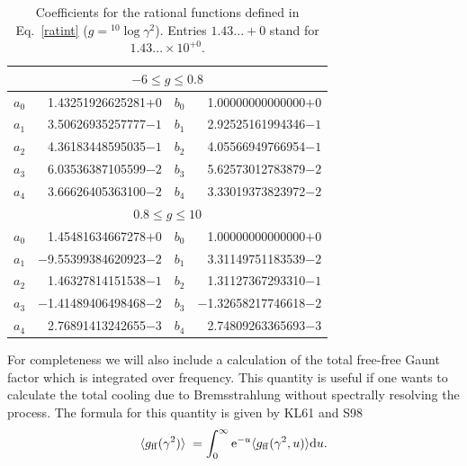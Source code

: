 \documentclass[useAMS,usenatbib]{mn2e}
\begin{document}
\begin{table}
\caption{Coefficients for the rational functions defined in Eq.~\ref{ratint}
  ($g = {}^{10}\log\gamma^2$). Entries $1.43...+0$ stand for
  $1.43...\times10^{+0}$.\label{ratcoef}}
\begin{tabular}{lrlr}
\hline
\multicolumn{4}{c}{$-6 \leq g \leq 0.8$} \\
\hline
$a_0$ & 1.43251926625281$+0$ & $b_0$ & 1.00000000000000$+0$ \\
$a_1$ & 3.50626935257777$-1$ & $b_1$ & 2.92525161994346$-1$ \\
$a_2$ & 4.36183448595035$-1$ & $b_2$ & 4.05566949766954$-1$ \\
$a_3$ & 6.03536387105599$-2$ & $b_3$ & 5.62573012783879$-2$ \\
$a_4$ & 3.66626405363100$-2$ & $b_4$ & 3.33019373823972$-2$ \\
\hline
\multicolumn{4}{c}{$0.8 \leq g \leq 10$} \\
\hline
$a_0$ &    1.45481634667278$+0$ & $b_0$ &    1.00000000000000$+0$ \\
$a_1$ & $-$9.55399384620923$-2$ & $b_1$ &    3.31149751183539$-2$ \\
$a_2$ &    1.46327814151538$-1$ & $b_2$ &    1.31127367293310$-1$ \\
$a_3$ & $-$1.41489406498468$-2$ & $b_3$ & $-$1.32658217746618$-2$ \\
$a_4$ &    2.76891413242655$-3$ & $b_4$ &    2.74809263365693$-3$ \\
\hline
\end{tabular}
\end{table}

For completeness we will also include a calculation of the total free-free
Gaunt factor which is integrated over frequency. This quantity is useful if
one wants to calculate the total cooling due to Bremsstrahlung without
spectrally resolving the process. The formula for this quantity is given by
KL61 and S98
\begin{equation}
\langle g_{\rm ff}(\gamma^2)\rangle \; = \int_0^\infty {\rm e}^{-u} \langle g_{\rm ff}(\gamma^2,u)\rangle {\rm d}u.
\label{frav:gff}
\end{equation}
\end{document}
